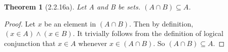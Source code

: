 \documentclass[a4paper, 12pt]{article}
\theoremstyle{plain}
\newtheorem*{theorem*}{Theorem}
\begin{document}
	
	\begin{theorem*}[2.2.16a]
		Let A and B be sets. $(A \cap B) \subseteq A$.
	\end{theorem*}
	
	\begin{proof}
		Let $x$ be an element in $(A \cap B)$. Then by definition, $(x \in A) \land (x \in B)$. It trivially follows from the definition of logical conjunction that $x \in A$ whenever $x \in (A \cap B)$. So $(A \cap B) \subseteq A$. 
	\end{proof}
\end{document}
